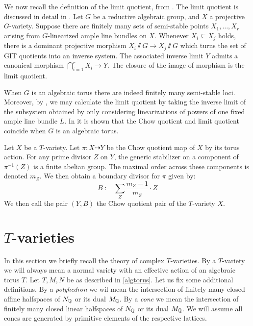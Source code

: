 We now recall the definition of the limit quotient, from \cite{mumford1994}. The limit quotient is discussed in detail in \cite{baker2012}. Let \(G\) be a reductive algebraic group, and \(X\) a projective \(G\)-variety. Suppose there are finitely many sets of semi-stable points \(X_1,\dots,X_r\) arising from \(G\)-linearized ample line bundles on \(X\).  Whenever \(X_i \subseteq X_j\) holds, there is a dominant projective morphism \(X_i \sslash G \to X_j \sslash G\) which turns the set of GIT quotients into an inverse system. The associated inverse limit \(Y\) admits a canonical morphism \(\bigcap_{i=1}^r X_i \to Y\). The closure of the image of morphism is the limit quotient.

When \(G\) is an algebraic torus there are indeed finitely many semi-stable loci. Moreover, by \cite[Corollary 2.7]{baker2012}, we may calculate the limit quotient by taking the inverse limit of the subsystem obtained by only considering linearizations of powers of one fixed ample line bundle \(L\).
%
%
%
In \cite[Proposition 2.5]{baker2012} it is shown that the Chow quotient and limit quotient coincide when \(G\) is an algebraic torus.

Let \(X\) be a \(T\)-variety. Let \(\pi:X \dashrightarrow Y\) be the Chow quotient map of \(X\) by its torus action. For any prime divisor \(Z\) on \(Y\), the generic stabilizer on a component of \(\pi^{-1}(Z)\) is a finite abelian group. The maximal order across these components is denoted \(m_Z\). We then obtain a boundary divisor for \(\pi\) given by:
\[
B := \sum_Z \frac{m_Z-1}{m_Z} \cdot Z
\]
We then call the pair \((Y,B)\) the Chow quotient pair of the \(T\)-variety \(X\).
\section{$T$-varieties} \label{prelim:Tvar}
In this section we briefly recall the theory of complex \(T\)-varieties. By a \(T\)-variety we will always mean a normal variety with an effective action of an algebraic torus \(T\). Let \(T,M,N\) be as described in \ref{algtorus}. Let us fix some additional definitions. By a \textit{polyhedron} we wil mean the intersection of finitely many closed affine halfspaces of \(N_{\mathbb{Q}}\) or its dual \(M_{\mathbb{Q}}\). By a \textit{cone} we mean the intersection of finitely many closed linear halfspaces of \(N_{\mathbb{Q}}\) or its dual \(M_{\mathbb{Q}}\). We will assume all cones are generated by primitive elements of the respective lattices.
